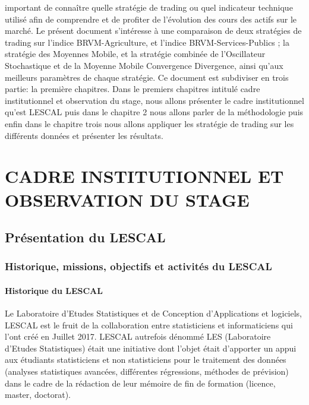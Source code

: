 {important de connaître quelle stratégie de trading ou quel indicateur
technique utilisé afin de comprendre et de profiter de l'évolution des
cours des actifs sur le marché. Le présent document s'intéresse à une
comparaison de deux stratégies de trading sur l'indice BRVM-Agriculture,
et l'indice BRVM-Services-Publics ; la stratégie des Moyennes Mobile, et
la stratégie combinée de l'Oscillateur Stochastique et de la Moyenne
Mobile Convergence Divergence, ainsi qu'aux meilleurs paramètres de
chaque stratégie. Ce document est subdiviser en trois partie: la
première chapitres. Dans le premiers chapitres intitulé cadre
institutionnel et observation du stage, nous allons présenter le cadre
institutionnel qu'est LESCAL puis dans le chapitre 2 nous allons parler
de la méthodologie puis enfin dans le chapitre trois nous allons
appliquer les stratégie de trading sur les différents données et
présenter les résultats. }

\section{CADRE INSTITUTIONNEL ET OBSERVATION DU
STAGE}\label{cadre-institutionnel-et-observation-du-stage}

\subsection{Présentation du LESCAL}\label{pruxe9sentation-du-lescal}

\subsubsection{\texorpdfstring{ Historique, missions, objectifs et
activités du
LESCAL}{ Historique, missions, objectifs et activités du LESCAL}}\label{historique-missions-objectifs-et-activituxe9s-du-lescal}

\paragraph{Historique du LESCAL}\label{historique-du-lescal}

Le Laboratoire d'Etudes Statistiques et de Conception d'Applications et
logiciels, LESCAL est le fruit de la collaboration entre statisticiens
et informaticiens qui l'ont créé en Juillet 2017. LESCAL autrefois
dénommé LES (Laboratoire d'Etudes Statistiques) était une initiative
dont l'objet était d'apporter un appui aux étudiants statisticiens et
non statisticiens pour le traitement des données (analyses statistiques
avancées, différentes régressions, méthodes de prévision) dans le cadre
de la rédaction de leur mémoire de fin de formation (licence, master,
doctorat).

